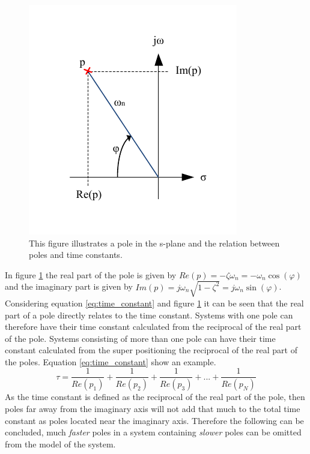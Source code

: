 \begin{figure}[htb]
	\centering
	\includegraphics[scale=1,trim=0 0 0 0]{graphics/splane.pdf} %
	\caption{This figure illustrates a pole in the s-plane and the relation between poles and time constants.}
	\label{fig:s_plane}			%
\end{figure}
In figure \ref{fig:s_plane} the real part of the pole is given by $Re(p) = - \zeta\omega_{n} = - \omega_{n} \cos(\varphi)$ and the imaginary part is given by $Im(p) = j\omega_{n}\sqrt{1 - \zeta^{2}} = j\omega_{n}\sin(\varphi)$. Considering equation \ref{eq:time_constant} and figure \ref{fig:s_plane} it can be seen that the real part of a pole directly relates to the time constant. Systems with one pole can therefore have their time constant calculated from the reciprocal of the real part of the pole. Systems consisting of more than one pole can have their time constant calculated from the super positioning the reciprocal of the real part of the poles. Equation \ref{eq:time_constant} show an example.
\begin{equation}
	\tau = \frac{1}{Re(p_{1})} + \frac{1}{Re(p_{2})} + \frac{1}{Re(p_{3})} + ... + \frac{1}{Re(p_{N})}\label{eq:time_constant}
\end{equation}
As the time constant is defined as the reciprocal of the real part of the pole, then poles far away from the imaginary axis will not add that much to the total time constant as poles located near the imaginary axis. Therefore the following can be concluded, much \textit{faster} poles in a system containing \textit{slower} poles can be omitted from the model of the system.

